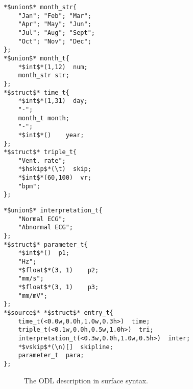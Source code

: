 \newsavebox{\thirdlisting}
\begin{lrbox}{\thirdlisting}%
\small
\begin{lstlisting}[basicstyle=\tiny,]
*$union$* month_str{
    "Jan"; "Feb"; "Mar";
    "Apr"; "May"; "Jun";
    "Jul"; "Aug"; "Sept";
    "Oct"; "Nov"; "Dec";
};
*$union$* month_t{
    *$int$*(1,12)  num;
    month_str str;
};
*$struct$* time_t{
    *$int$*(1,31)  day;
    "-";
    month_t month;
    "-";
    *$int$*()    year;
};
*$struct$* triple_t{
    "Vent. rate";
    *$hskip$*(\t)  skip;
    *$int$*(60,100)  vr;
    "bpm";
};
\end{lstlisting}
\end{lrbox}
\newsavebox{\forthlisting}
\begin{lrbox}{\forthlisting}
\begin{lstlisting}[basicstyle=\tiny,]
*$union$* interpretation_t{
    "Normal ECG";
    "Abnormal ECG";
};
*$struct$* parameter_t{
    *$int$*()  p1;
    "Hz";
    *$float$*(3, 1)    p2;
    "mm/s";
    *$float$*(3, 1)    p3;
    "mm/mV";
};
*$source$* *$struct$* entry_t{
    time_t(<0.0w,0.0h,1.0w,0.3h>)  time;
    triple_t(<0.1w,0.0h,0.5w,1.0h>)  tri;
    interpretation_t(<0.3w,0.0h,1.0w,0.5h>)  inter;
    *$vskip$*(\n)[]  skipline;
    parameter_t  para;
};
\end{lstlisting}
\end{lrbox}

\begin{figure*}[ht]
\centering
\subfloat{
\scalebox{1.6}{\usebox{\thirdlisting}}
}
\hspace{1.5cm}
\subfloat{
\scalebox{1.6}{\usebox{\forthlisting}}
}
\caption{The ODL description in surface syntax.}
\label{fig:running-odl-surface}
\end{figure*}

